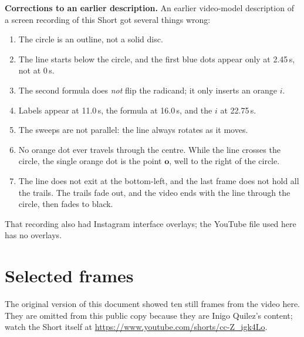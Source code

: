 \documentclass[10pt,a4paper]{article}
\newcommand{\vo}{\mathbf{o}}\newcommand{\vd}{\mathbf{d}}\newcommand{\vp}{\mathbf{p}}
\begin{document}
\textbf{Corrections to an earlier description.} An earlier video-model description of a screen recording of this Short got several things wrong:
\begin{enumerate}
\item The circle is an outline, not a solid disc.
\item The line starts below the circle, and the first blue dots appear only at 2.45\,s, not at 0\,s.
\item The second formula does \emph{not} flip the radicand; it only inserts an orange $i$.
\item Labels appear at 11.0\,s, the formula at 16.0\,s, and the $i$ at 22.75\,s.
\item The sweeps are not parallel: the line always rotates as it moves.
\item No orange dot ever travels through the centre. While the line crosses the circle, the single orange dot is the point $\vo$, well to the right of the circle.
\item The line does not exit at the bottom-left, and the last frame does not hold all the trails. The trails fade out, and the video ends with the line through the circle, then fades to black.
\end{enumerate}
That recording also had Instagram interface overlays; the YouTube file used here has no overlays.

\appendix
\section{Selected frames}
The original version of this document showed ten still frames from the video here. They are omitted from this public copy because they are Inigo Quilez's content; watch the Short itself at \url{https://www.youtube.com/shorts/cc-Z_igk4Lo}.
\end{document}
